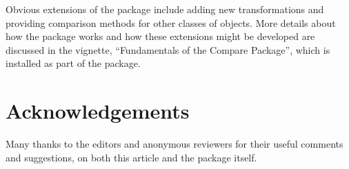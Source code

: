 Obvious extensions of the  package include adding
new transformations and providing comparison 
methods for other classes of objects.  
More details about how the package works and how these 
extensions might be developed are discussed in
the vignette, ``Fundamentals of the Compare Package'',
which is installed as part of the  package.

\section*{Acknowledgements}

Many thanks to the editors and anonymous reviewers for their useful
comments and suggestions, on both this article and the 
 package itself.


